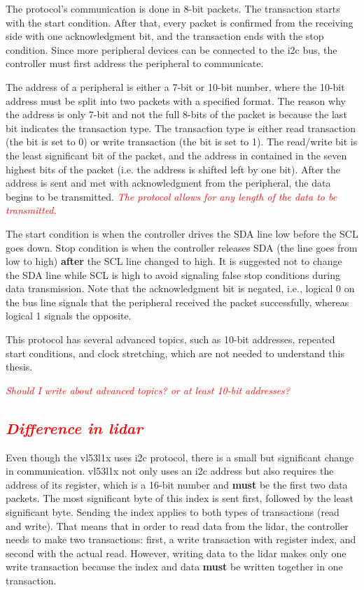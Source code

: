 \documentclass[
  digital,     %
  oneside,     %
  nosansbold,  %
  nocolorbold, %
  lof,         %
  lot,         %
]{fithesis4}
\newcommand{\TODO}[1]{\textcolor{red}{\textit{#1}}}
\begin{document}
{{{The protocol's communication is done in 8-bit packets. The transaction starts with the start condition. After that, every packet is confirmed from the receiving side with one acknowledgment bit, and the transaction ends with the stop condition. Since more peripheral devices can be connected to the \acrshort{i2c} bus, the controller must first address the peripheral to communicate.

The address of a peripheral is either a 7-bit or 10-bit number, where the 10-bit address must be split into two packets with a specified format. The reason why the address is only 7-bit and not the full 8-bits of the packet is because the last bit indicates the transaction type. The transaction type is either read transaction (the bit is set to 0) or write transaction (the bit is set to 1). The read/write bit is the least significant bit of the packet, and the address in contained in the seven highest bits of the packet (i.e. the address is shifted left by one bit). After the address is sent and met with acknowledgment from the peripheral, the data begins to be transmitted. \TODO{The protocol allows for any length of the data to be transmitted.}

The start condition is when the controller drives the SDA line low before the SCL goes down. Stop condition is when the controller releases SDA (the line goes from low to high) \textbf{after} the SCL line changed to high. It is suggested not to change the SDA line while SCL is high to avoid signaling false stop conditions during data transmission. Note that the acknowledgment bit is negated, i.e., logical 0 on the bus line signals that the peripheral received the packet successfully, whereas logical 1 signals the opposite.

This protocol has several advanced topics, such as 10-bit addresses, repeated start conditions, and clock stretching, which are not needed to understand this thesis.

\TODO{Should I write about advanced topics? or at least 10-bit addresses?}

\subsection{ \TODO{Difference in lidar} } \label{sec:lidar-i2c}
Even though the \gls{vl53l1x} uses \acrshort{i2c} protocol, there is a small but significant change in communication. \gls{vl53l1x} not only uses an \acrshort{i2c} address but also requires the address of its register, which is a 16-bit number and \textbf{must} be the first two data packets. The most significant byte of this index is sent first, followed by the least significant byte. Sending the index applies to both types of transactions (read and write). That means that in order to read data from the \acrshort{lidar}, the controller needs to make two transactions: first, a write transaction with register index, and second with the actual read. However, writing data to the \acrshort{lidar} makes only one write transaction because the index and data \textbf{must} be written together in one transaction.

}}}
\end{document}
